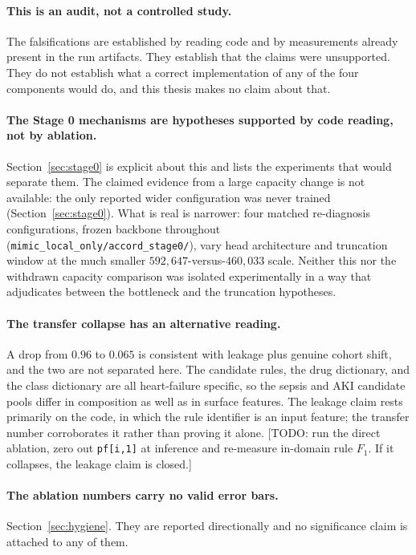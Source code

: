 \paragraph{This is an audit, not a controlled study.} The falsifications are
established by reading code and by measurements already present in the run
artifacts. They establish that the claims were unsupported. They do not
establish what a correct implementation of any of the four components would do,
and this thesis makes no claim about that.

\paragraph{The Stage 0 mechanisms are hypotheses supported by code reading, not
by ablation.} Section~\ref{sec:stage0} is explicit about this and lists the
experiments that would separate them. The claimed evidence from a large
capacity change is not available: the only reported wider configuration was
never trained (Section~\ref{sec:stage0}). What is real is narrower: four
matched re-diagnosis configurations, frozen backbone throughout
(\texttt{mimic\_local\_only/accord\_stage0/}), vary head architecture and
truncation window at the much smaller $592{,}647$-versus-$460{,}033$ scale.
Neither this nor the withdrawn capacity comparison was isolated
experimentally in a way that adjudicates between the bottleneck and the
truncation hypotheses.

\paragraph{The transfer collapse has an alternative reading.} A drop from $0.96$
to $0.065$ is consistent with leakage plus genuine cohort shift, and the two are
not separated here. The candidate rules, the drug dictionary, and the class
dictionary are all heart-failure specific, so the sepsis and AKI candidate pools
differ in composition as well as in surface features. The leakage claim rests
primarily on the code, in which the rule identifier is an input feature; the
transfer number corroborates it rather than proving it alone.
[TODO: run the direct ablation, zero out \texttt{pf[i,1]} at inference and
re-measure in-domain rule $F_1$. If it collapses, the leakage claim is closed.]

\paragraph{The ablation numbers carry no valid error bars.}
Section~\ref{sec:hygiene}. They are reported directionally and no significance
claim is attached to any of them.

